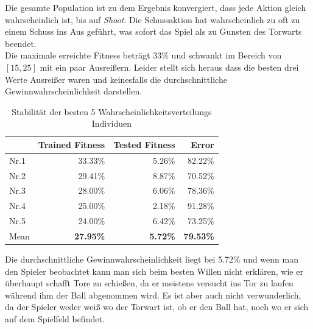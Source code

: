                 \noindent
                Die gesamte Population ist zu dem Ergebnis konvergiert, dass jede Aktion gleich wahrscheinlich ist, bis auf \textit{Shoot}. Die Schussaktion hat wahrscheinlich zu oft zu einem Schuss ins Aus geführt, was sofort das Spiel als zu Gunsten des Torwarts beendet.\\

                \noindent
                Die maximale erreichte Fitness beträgt 33\% und schwankt im Bereich von $[15,25]$ mit ein paar Ausreißern. Leider stellt sich heraus dass die besten drei Werte Ausreißer waren und keinesfalls die durchschnittliche Gewinnwahrscheinlichkeit darstellen. 

                \begin{table}[H]
                    \begin{center}
                    \begin{tabular}{ |l|r|r|r| } 
                        \hline
                        \hfill & Trained Fitness   & Tested Fitness   &          Error    \\ \hline
                          Nr.1 &          33.33\%  &          5.26\%  &          82.22\%  \\  
                          Nr.2 &          29.41\%  &          8.87\%  &          70.52\%  \\  
                          Nr.3 &          28.00\%  &          6.06\%  &          78.36\%  \\ 
                          Nr.4 &          25.00\%  &          2.18\%  &          91.28\%  \\ 
                          Nr.5 &          24.00\%  &          6.42\%  &          73.25\%  \\ \hline
                          Mean &  \textbf{27.95\%} &  \textbf{5.72\%}  & \textbf{79.53\%} \\ \hline
                    \end{tabular}
                    \end{center}
                    \caption{Stabilität der besten 5 Wahrscheinlichkeitsverteilungs Individuen \label{fig:actiondisttable}}
                \end{table}
                \noindent
                Die durchschnittliche Gewinnwahrscheinlichkeit liegt bei 5.72\% und wenn man den Spieler beobachtet kann man sich beim besten Willen nicht erklären, wie er überhaupt schafft Tore zu schießen, da er meistens versucht ins Tor zu laufen während ihm der Ball abgenommen wird. Es ist aber auch nicht verwunderlich, da der Spieler weder weiß wo der Torwart ist, ob er den Ball hat, noch wo er sich auf dem Spielfeld befindet. \\

